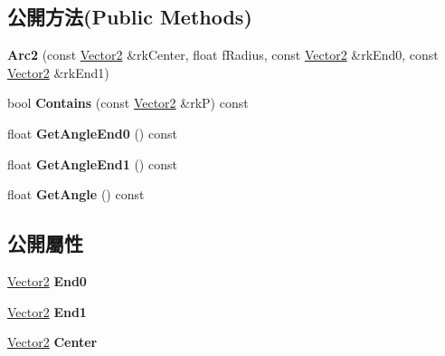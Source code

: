 \subsection*{公開方法(Public Methods)}
\begin{DoxyCompactItemize}
\item 
{\bfseries Arc2} (const \hyperlink{class_magnum_1_1_vector2}{Vector2} \&rk\+Center, float f\+Radius, const \hyperlink{class_magnum_1_1_vector2}{Vector2} \&rk\+End0, const \hyperlink{class_magnum_1_1_vector2}{Vector2} \&rk\+End1)\hypertarget{class_magnum_1_1_arc2_afae9a0c77a3175fbca5be625c6127a25}{}\label{class_magnum_1_1_arc2_afae9a0c77a3175fbca5be625c6127a25}

\item 
bool {\bfseries Contains} (const \hyperlink{class_magnum_1_1_vector2}{Vector2} \&rkP) const \hypertarget{class_magnum_1_1_arc2_aaaf056f9e0f9bba716d56131397bfab8}{}\label{class_magnum_1_1_arc2_aaaf056f9e0f9bba716d56131397bfab8}

\item 
float {\bfseries Get\+Angle\+End0} () const \hypertarget{class_magnum_1_1_arc2_aa867ac847bd0f5a468730dbf624facf2}{}\label{class_magnum_1_1_arc2_aa867ac847bd0f5a468730dbf624facf2}

\item 
float {\bfseries Get\+Angle\+End1} () const \hypertarget{class_magnum_1_1_arc2_a34101ca5668c943b25bb63e520a4b641}{}\label{class_magnum_1_1_arc2_a34101ca5668c943b25bb63e520a4b641}

\item 
float {\bfseries Get\+Angle} () const \hypertarget{class_magnum_1_1_arc2_a1b9273acc67099ca842bf440e45297f6}{}\label{class_magnum_1_1_arc2_a1b9273acc67099ca842bf440e45297f6}

\end{DoxyCompactItemize}
\subsection*{公開屬性}
\begin{DoxyCompactItemize}
\item 
\hyperlink{class_magnum_1_1_vector2}{Vector2} {\bfseries End0}\hypertarget{class_magnum_1_1_arc2_aa215061ff871720a8c6c93974f5ed09f}{}\label{class_magnum_1_1_arc2_aa215061ff871720a8c6c93974f5ed09f}

\item 
\hyperlink{class_magnum_1_1_vector2}{Vector2} {\bfseries End1}\hypertarget{class_magnum_1_1_arc2_adccde539a56fd7a0924bcb137f0621e4}{}\label{class_magnum_1_1_arc2_adccde539a56fd7a0924bcb137f0621e4}

\item 
\hyperlink{class_magnum_1_1_vector2}{Vector2} {\bfseries Center}\hypertarget{class_magnum_1_1_arc2_aba12d4ac2ac33656ddc8fb24e6a3bd91}{}\label{class_magnum_1_1_arc2_aba12d4ac2ac33656ddc8fb24e6a3bd91}

\end{DoxyCompactItemize}


